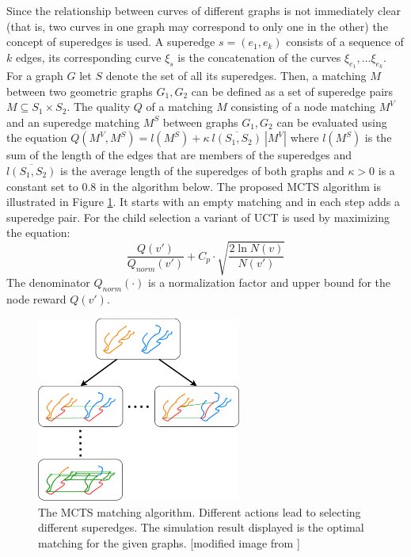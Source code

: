 Since the relationship between curves of different graphs is not immediately clear (that is, two curves in one graph may correspond to only one in the other) the concept of superedges is used. A superedge $s=(e_1,e_k)$ consists of a sequence of $k$ edges, its corresponding curve $\xi_s$ is the concatenation of the curves $\xi_{e_1},\ldots\xi_{e_k}$. For a graph $G$ let $S$ denote the set of all its superedges. Then, a matching $M$ between two geometric graphs $G_1,G_2$ can be defined as a set of superedge pairs $M \subseteq S_1 \times S_2$. The quality $Q$ of a matching $M$ consisting of a node matching $M^V$ and an superedge matching $M^S$ between graphs $G_1,G_2$ can be evaluated using the equation $Q(M^V,M^S) = l(M^S) + \kappa \ \overline{l(S_1,S_2)} \ \left| M^V \right|$ where $l(M^S)$ is the sum of the length of the edges that are members of the superedges and $\overline{l(S_1,S_2)}$ is the average length of the superedges of both graphs and $\kappa > 0$ is a constant set to $0.8$ in the algorithm below. The proposed MCTS algorithm is illustrated in Figure \ref{fig:matching}. It starts with an empty matching and in each step adds a superedge pair. For the child selection a variant of UCT is used by maximizing the equation:
\begin{equation*}
    \frac{Q(v')}{Q_{norm}(v')}+C_p \cdot \sqrt{\frac{2 \ln N(v)}{N(v')}}
\end{equation*} The denominator $Q_{norm}(\cdot)$ is a normalization factor and upper bound for the node reward $Q(v')$.
\begin{figure}[ht]
    \centering
    \includegraphics[width=0.6\textwidth]{img/matching.png}
    \caption{The MCTS matching algorithm. Different actions lead to selecting different superedges. The simulation result displayed is the optimal matching for the given graphs. [modified image from \cite{pinheiro2016geometric}]}
    \label{fig:matching}
\end{figure}
\FloatBarrier
